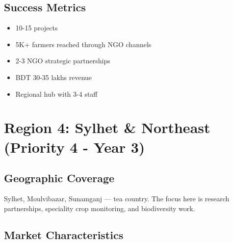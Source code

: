 \subsection{Success Metrics}

\begin{itemize}
    \item 10-15 projects
    \item 5K+ farmers reached through NGO channels
    \item 2-3 NGO strategic partnerships
    \item BDT 30-35 lakhs revenue
    \item Regional hub with 3-4 staff
\end{itemize}

\section{Region 4: Sylhet \& Northeast (Priority 4 - Year 3)}

\subsection{Geographic Coverage}

Sylhet, Moulvibazar, Sunamganj --- tea country. The focus here is research partnerships, speciality crop monitoring, and biodiversity work.

\subsection{Market Characteristics}

